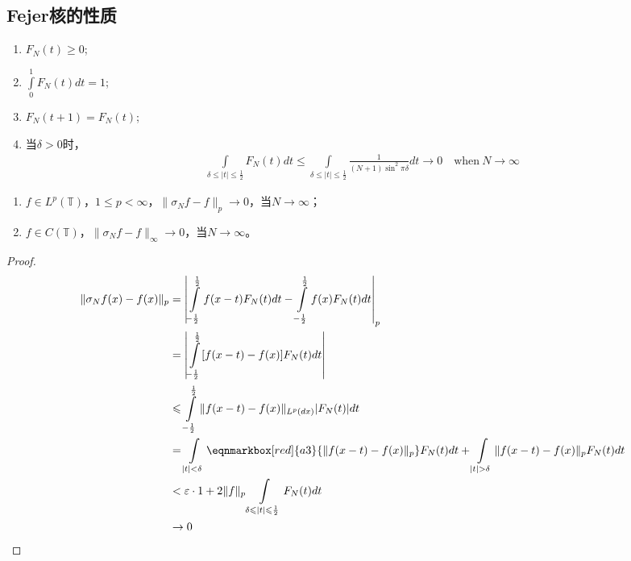 \subsection{Fejer核的性质}
\begin{enumerate}[leftmargin=1cm, label=\arabic*]
    \item $F_N(t) \geqslant 0$;
    \item $\int\limits_0^1 F_N(t) dt = 1$;
    \item $F_N(t+1) = F_N(t)$;
    \item 当$\delta >0$时，
    \begin{align*}
    \int\limits_{\delta\leqslant|t|\leqslant\frac{1}{2}} F_N(t) dt \leqslant \int\limits_{\delta\leqslant|t|\leqslant\frac{1}{2}} \frac{1}{(N+1)\sin^2 \pi\delta} dt \to 0 \quad \text{when}\ N\to\infty
    \end{align*}
\end{enumerate}

\begin{theorem}
    \begin{enumerate}[leftmargin=1cm, label=\arabic*]
        \item $f\in L^p(\mathbb{T})$，$1\leqslant p < \infty$，$\|\sigma_N f -f\|_p \to 0$，当$N\to\infty$；
        \item $f\in C(\mathbb{T})$，$\|\sigma_N f - f\|_{\infty} \to 0$，当$N\to\infty$。
    \end{enumerate}
\end{theorem}
\begin{proof}
    \begin{align*}
        \|\sigma_N f(x) - f(x)\|_p &= \left|\int\limits_{-\frac{1}{2}}^{\frac{1}{2}} f(x-t) F_N(t) dt -  \int\limits_{-\frac{1}{2}}^{\frac{1}{2}} f(x) F_N(t) dt  \right|_p \\
        & = \left| \int\limits_{-\frac{1}{2}}^{\frac{1}{2}} [f(x-t) - f(x)] F_N(t) dt \right| \\
        & \leqslant \int\limits_{-\frac{1}{2}}^{\frac{1}{2}} \|f(x-t) - f(x)\|_{L^p(dx)} |F_N(t)| dt \\
        & = \int\limits_{|t|< \delta} \eqnmarkbox[red]{a3}{\|f(x-t) - f(x)\|_p} F_N(t) dt + \int\limits_{|t| > \delta} \|f(x-t) - f(x)\|_p F_N(t) dt \\
        & < \varepsilon \cdot 1 + 2\|f\|_p \int\limits_{\delta\leqslant |t| \leqslant \frac{1}{2}} F_N(t) dt\\
        & \to 0
    \end{align*}
\end{proof}

